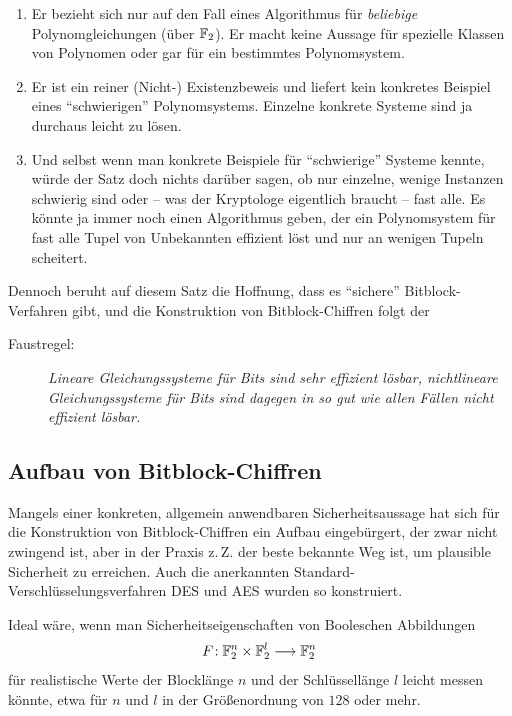 \begin{refsegment}
\begin{enumerate}
\item Er bezieht sich nur auf den Fall eines Algorithmus für {\em beliebige}
    Polynomgleichungen (über $\mathbb{F}_2$).
    Er macht keine Aussage für spezielle
    Klassen von Polynomen oder gar für ein bestimmtes Polynomsystem.
\item Er ist ein reiner (Nicht-) Existenzbeweis und liefert kein konkretes Beispiel
    eines "`schwierigen"' Polynomsystems. Einzelne konkrete Systeme sind ja
    durchaus leicht zu lösen.
\item Und selbst wenn man konkrete Beispiele für "`schwierige"' Systeme kennte,
    würde der Satz doch nichts darüber sagen, ob nur einzelne, wenige
    Instanzen schwierig sind oder -- was der Kryptologe eigentlich
    braucht -- fast alle. Es könnte ja immer noch einen Algorithmus geben,
    der ein Polynomsystem für fast alle Tupel von Unbekannten effizient
    löst und nur an wenigen Tupeln scheitert.
\end{enumerate}
Dennoch beruht auf diesem Satz die Hoffnung, dass es "`sichere"'
Bitblock-Verfahren gibt, und die Konstruktion von
Bitblock-Chiffren folgt der
\begin{description}
   \item[Faustregel:] {\em Lineare
      Gleichungssysteme
      für Bits sind sehr effizient lösbar, nichtlineare
      Gleichungssysteme
      für Bits sind dagegen in so gut wie allen Fällen nicht effizient lösbar.}
\end{description}

\subsection{Aufbau von Bitblock-Chiffren}\label{ss-bool-bbconstr}

Mangels einer konkreten, allgemein anwendbaren Sicherheitsaussage hat sich
für die Konstruktion von Bitblock-Chiffren ein
Aufbau eingebürgert, der zwar nicht zwingend ist, aber in der Praxis z.\,Z.
der beste bekannte Weg ist, um plausible Sicherheit zu erreichen.
Auch die anerkannten Standard-Verschlüsselungsverfahren
DES und AES wurden so konstruiert.

Ideal wäre, wenn man Sicherheitseigenschaften von Booleschen
Abbildungen
\[
     F\!: \mathbb{F}_2^n \times \mathbb{F}_2^l \longrightarrow \mathbb{F}_2^n
\]
für realistische Werte der Blocklänge $n$ und der
Schlüssellänge $l$ leicht messen könnte,
etwa für $n$ und $l$ in der Größenordnung von $128$ oder mehr.


\end{refsegment}
